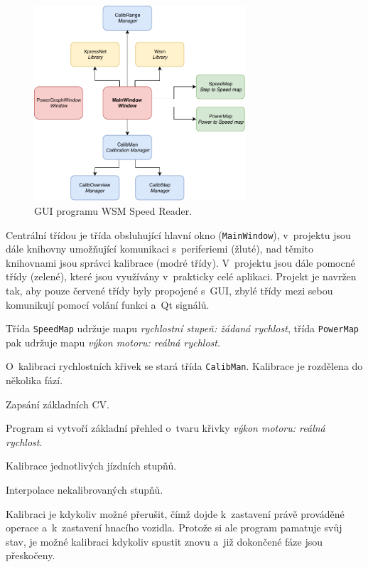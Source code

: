 \begin{figure}[h]
\includegraphics[width=0.7\textwidth]{data/ac_classes.pdf}
\caption{GUI programu WSM Speed Reader.}
\label{fig:ac-classes}
\end{figure}

Centrální třídou je třída obsluhující hlavní okno (\texttt{MainWindow}),
v~projektu jsou dále knihovny umožňující komunikaci s~periferiemi (žluté),
nad těmito knihovnami jsou správci kalibrace (modré třídy). V~projektu jsou
dále pomocné třídy (zelené), které jsou využívány v~prakticky celé aplikaci.
Projekt je navržen tak, aby pouze červené třídy byly propojené s~GUI, zbylé
třídy mezi sebou komunikují pomocí volání funkci a~Qt signálů.

Třída \texttt{SpeedMap} udržuje mapu \textit{rychlostní stupeň: žádaná rychlost},
třída \texttt{PowerMap} pak udržuje mapu \textit{výkon motoru: reálná rychlost}.

O~kalibraci rychlostních křivek se stará třída \texttt{CalibMan}. Kalibrace
je rozdělena do několika fází.

\begin{compactenum}
\item Zapsání základních CV.
\item Program si vytvoří základní přehled o~tvaru křivky \textit{výkon motoru:
      reálná rychlost}.
\item Kalibrace jednotlivých jízdních stupňů.
\item Interpolace nekalibrovaných stupňů.
\end{compactenum}

Kalibraci je kdykoliv možné přerušit, čímž dojde k~zastavení právě prováděné
operace a~k~zastavení hnacího vozidla. Protože si ale program pamatuje svůj
stav, je možné kalibraci kdykoliv spustit znovu a~již dokončené fáze jsou
přeskočeny.

